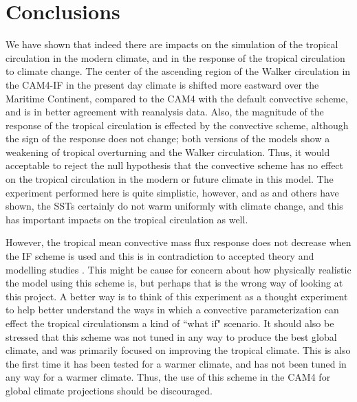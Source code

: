 \documentclass[letterpaper,12pt,titlepage,oneside,final]{book}
\begin{document}
\section{Conclusions}

We have shown that indeed there are impacts on the simulation of the tropical circulation in the modern climate, and in the response of the tropical circulation to climate change. The center of the ascending region of the Walker circulation in the CAM4-IF in the present day climate is shifted more eastward over the Maritime Continent, compared to the CAM4 with the default convective scheme, and is in better agreement with reanalysis data. Also, the magnitude of the response of the tropical circulation is effected by the convective scheme, although the sign of the response does not change; both versions of the models show a weakening of tropical overturning and the Walker circulation. Thus, it would acceptable to reject the null hypothesis that the convective scheme has no effect on the tropical circulation in the modern or future climate in this model. The experiment performed here is quite simplistic, however, and as \citep{he_anthropogenic_2015,ma_regional_2012} and others have shown, the SSTs certainly do not warm uniformly with climate change, and this has important impacts on the tropical circulation as well.

However, the tropical mean convective mass flux response does not decrease when the IF scheme is used and this is in contradiction to accepted theory \citep{held_robust_2006,vecchi_weakening_2006} and modelling studies \citep{chadwick_spatial_2012}. This might be cause for concern about how physically realistic the model using this scheme is, but perhaps that is the wrong way of looking at this project. A better way is to think of this experiment as a thought experiment to help better understand the ways in which a convective parameterization can effect the tropical circulationsm a kind of ``what if" scenario. It should also be stressed that this scheme was not tuned in any way to produce the best global climate, and was primarily focused on improving the tropical climate. This is also the first time it has been tested for a warmer climate, and has not been tuned in any way for a warmer climate. Thus, the use of this scheme in the CAM4 for global climate projections should be discouraged.
\end{document}
